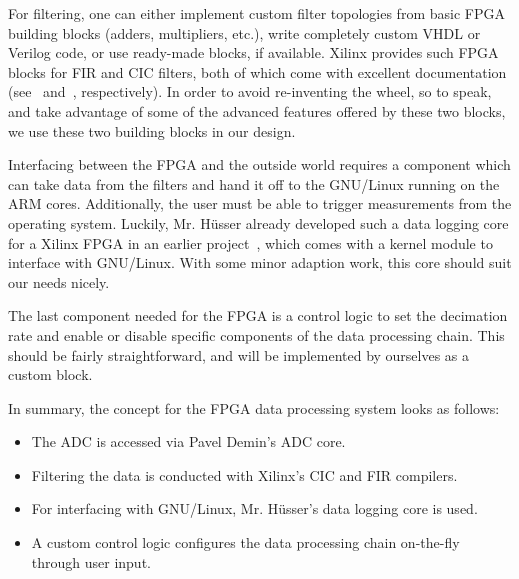 For filtering,  one can either  implement custom filter topologies  from basic
FPGA building blocks (adders, multipliers, etc.), write completely custom VHDL
or Verilog code, or use ready-made blocks, if available.  Xilinx provides such
FPGA  blocks for  FIR  and CIC  filters,  both of  which  come with  excellent
documentation  (see~\cite{xilinx:cic-compiler} and~\cite{xilinx:fir-compiler},
respectively).  In  order to avoid  re-inventing the  wheel, so to  speak, and
take advantage of  some of the advanced features offered  by these two blocks,
we use these two building blocks in our design.

Interfacing  between the  FPGA  and  the outside  world  requires a  component
which  can take  data  from the  filters  and  hand it  off  to the  GNU/Linux
running  on the  ARM cores. Additionally,  the user  must be  able to  trigger
measurements   from  the   operating  system. Luckily,   Mr. H\"usser already
developed  such  a  data  logging  core  for  a  Xilinx  FPGA  in  an  earlier
project~\cite{pita:github:huess-schnid},  which  comes  with  a  kernel
module to interface  with GNU/Linux. With some minor adaption  work, this core
should suit our needs nicely.

The  last  component needed  for  the  FPGA is  a  control  logic to  set  the
decimation  rate  and  enable  or  disable specific  components  of  the  data
processing  chain. This  should  be   fairly  straightforward,  and   will  be
implemented by ourselves as a custom block.

In summary, the concept for the FPGA data processing system looks as follows:
\begin{itemize}\tightlist
    \item
        The ADC is accessed via Pavel Demin's ADC core.
    \item
        Filtering the data is conducted with Xilinx's CIC and FIR compilers.
    \item
        For interfacing  with GNU/Linux,  Mr. H\"usser's data logging  core is
        used.
    \item
        A custom control logic configures the data processing chain on-the-fly
        through user input.
\end{itemize}

%
%
